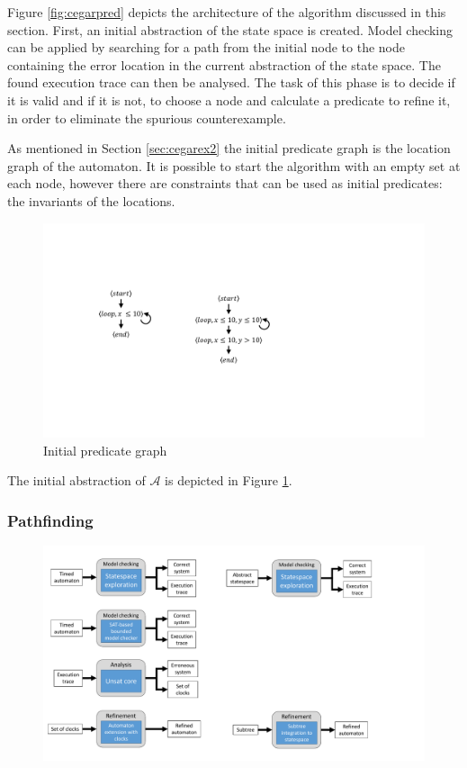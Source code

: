 Figure \ref{fig:cegarpred} depicts the architecture of the algorithm discussed in this section. First, an initial abstraction of the state space is created. Model checking can be applied by searching for a path from the initial node to the node containing the error location in the current abstraction of the state space.
The found execution trace can then be analysed. The task of this phase is to decide if it is valid and if it is not, to choose a node and calculate a predicate to refine it, in order to eliminate the spurious counterexample.

As mentioned in Section \ref{sec:cegarex2} the initial predicate graph is the location graph of the automaton. It is possible to start the algorithm with an empty set at each node, however there are constraints that can be used as initial predicates: the invariants of the locations.

\begin{figure} 
	\centering
	\includegraphics[width=.2\textwidth]{include/figures/runex_pred_init}
	\caption{Initial predicate graph}
	\label{fig:predinit}
\end{figure}

\begin{runningExample}
	The initial abstraction of $\mathcal{A}$ is depicted in Figure \ref{fig:predinit}.
\end{runningExample}

\subsubsection{Pathfinding}

\begin{figure}[h]
	\centering
	\includegraphics[width=.7\textwidth]{include/figures/modules_ssp_mc}
\end{figure}

